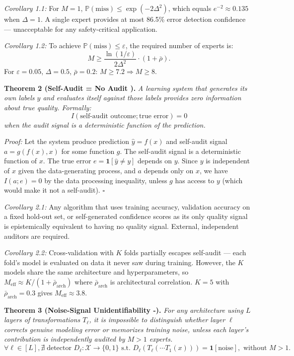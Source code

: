 \documentclass[12pt,a4paper]{article}
\theoremstyle{definition}
\newcommand{\Pbb}{\mathbb{P}}
\newcommand{\cX}{\mathcal{X}}
\newcommand{\ind}[1]{\mathbf{1}[#1]}
\begin{document}
\textit{Corollary 1.1:} For $M=1$, $\Pbb(\text{miss}) \le \exp(-2\Delta^2)$, which equals $e^{-2} \approx 0.135$ when $\Delta = 1$. A single expert provides at most 86.5\% error detection confidence — unacceptable for any safety-critical application.

\textit{Corollary 1.2:} To achieve $\Pbb(\text{miss}) \le \varepsilon$, the required number of experts is:
\begin{equation}\label{eq:M_required}
    M \ge \frac{\ln(1/\varepsilon)}{2\Delta^2} \cdot (1 + \bar{\rho}).
\end{equation}
For $\varepsilon = 0.05$, $\Delta = 0.5$, $\bar{\rho} = 0.2$: $M \ge 7.2 \Rightarrow M \ge 8$.

\medskip
\noindent\textbf{Theorem 2 (Self-Audit = No Audit ).} \textit{A learning system that generates its own labels $\hat{y}$ and evaluates itself against those labels provides zero information about true quality. Formally:}
\begin{equation}\label{eq:thm2}
    I(\text{self-audit outcome}; \text{true error}) = 0
\end{equation}
\textit{when the audit signal is a deterministic function of the prediction.}

\textit{Proof:} Let the system produce prediction $\hat{y} = f(x)$ and self-audit signal $a = g(f(x), x)$ for some function $g$. The self-audit signal is a deterministic function of $x$. The true error $e = \ind{\hat{y} \neq y}$ depends on $y$. Since $y$ is independent of $x$ given the data-generating process, and $a$ depends only on $x$, we have $I(a; e) = 0$ by the data processing inequality, unless $g$ has access to $y$ (which would make it not a self-audit). \hfill $\square$

\textit{Corollary 2.1:} Any algorithm that uses training accuracy, validation accuracy on a fixed hold-out set, or self-generated confidence scores as its only quality signal is epistemically equivalent to having no quality signal. External, independent auditors are required.

\textit{Corollary 2.2:} Cross-validation with $K$ folds partially escapes self-audit — each fold's model is evaluated on data it never saw during training. However, the $K$ models share the same architecture and hyperparameters, so $M_{\text{eff}} \approx K/(1 + \bar{\rho}_{\text{arch}})$ where $\bar{\rho}_{\text{arch}}$ is architectural correlation. $K=5$ with $\bar{\rho}_{\text{arch}}=0.3$ gives $M_{\text{eff}} \approx 3.8$.

\medskip
\noindent\textbf{Theorem 3 (Noise-Signal Unidentifiability -).} \textit{For any architecture using $L$ layers of transformations $T_\ell$, it is impossible to distinguish whether layer $\ell$ corrects genuine modeling error or memorizes training noise, unless each layer's contribution is independently audited by $M > 1$ experts.}
\begin{equation}\label{eq:thm3}
    \forall \ell \in [L], \nexists \; \text{detector } D_\ell: \cX \to \{0,1\} \text{ s.t. } D_\ell(T_\ell(\cdots T_1(x))) = \ind{\text{noise}}, \text{ without } M>1.
\end{equation}
\end{document}
